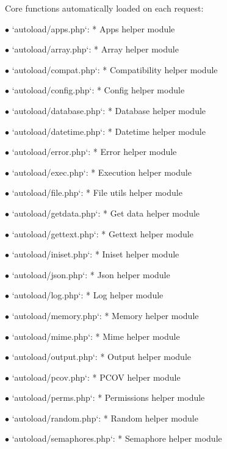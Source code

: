 \documentclass[a4paper]{article}
\begin{document}
Core functions automatically loaded on each request:

\begin{compactitem}
\item[\color{myblue}$\bullet$] `autoload/apps.php`: * Apps helper module
\item[\color{myblue}$\bullet$] `autoload/array.php`: * Array helper module
\item[\color{myblue}$\bullet$] `autoload/compat.php`: * Compatibility helper module
\item[\color{myblue}$\bullet$] `autoload/config.php`: * Config helper module
\item[\color{myblue}$\bullet$] `autoload/database.php`: * Database helper module
\item[\color{myblue}$\bullet$] `autoload/datetime.php`: * Datetime helper module
\item[\color{myblue}$\bullet$] `autoload/error.php`: * Error helper module
\item[\color{myblue}$\bullet$] `autoload/exec.php`: * Execution helper module
\item[\color{myblue}$\bullet$] `autoload/file.php`: * File utils helper module
\item[\color{myblue}$\bullet$] `autoload/getdata.php`: * Get data helper module
\item[\color{myblue}$\bullet$] `autoload/gettext.php`: * Gettext helper module
\item[\color{myblue}$\bullet$] `autoload/iniset.php`: * Iniset helper module
\item[\color{myblue}$\bullet$] `autoload/json.php`: * Json helper module
\item[\color{myblue}$\bullet$] `autoload/log.php`: * Log helper module
\item[\color{myblue}$\bullet$] `autoload/memory.php`: * Memory helper module
\item[\color{myblue}$\bullet$] `autoload/mime.php`: * Mime helper module
\item[\color{myblue}$\bullet$] `autoload/output.php`: * Output helper module
\item[\color{myblue}$\bullet$] `autoload/pcov.php`: * PCOV helper module
\item[\color{myblue}$\bullet$] `autoload/perms.php`: * Permissions helper module
\item[\color{myblue}$\bullet$] `autoload/random.php`: * Random helper module
\item[\color{myblue}$\bullet$] `autoload/semaphores.php`: * Semaphore helper module

\end{compactitem}
\end{document}

